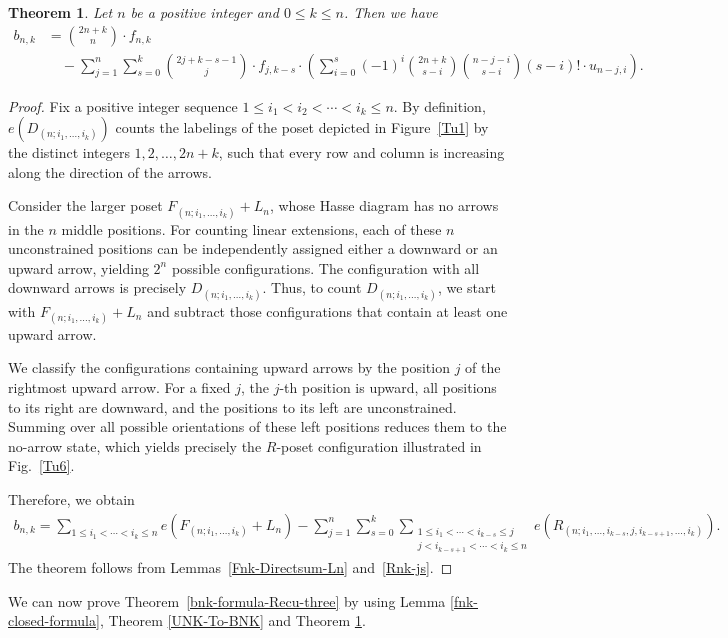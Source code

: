 \documentclass[reqno, 12pt]{article}
\newtheorem{thm}{Theorem}[section]
\theoremstyle{mydefinition}
\theoremstyle{myremark}
\numberwithin{algorithm}{section}
\begin{document}
\begin{thm}\label{bnk-formula-two}
Let $n$ be a positive integer and $0\leq k\leq n$. Then we have
\begin{align*}
b_{n,k}&=\binom{2n+k}{n}\cdot f_{n,k}
\\&\quad-\sum_{j=1}^n \sum_{s=0}^k \binom{2j+k-s-1}{j}\cdot f_{j,k-s}\cdot \left(\sum_{i=0}^s(-1)^i\binom{2n+k}{s-i}\binom{n-j-i}{s-i}(s-i)!\cdot u_{n-j,i}\right).
\end{align*}
\end{thm}
\begin{proof}
Fix a positive integer sequence $1\leq i_1<i_2<\cdots <i_k\leq n$.
By definition, $e(D_{(n; i_1,\ldots,i_k)})$ counts the labelings of the poset depicted in Figure~\ref{Tu1} by the distinct integers $1,2,\ldots,2n+k$, such that every row and column is increasing along the direction of the arrows.

Consider the larger poset $F_{(n; i_1,\ldots,i_k)}+L_n$, whose Hasse diagram has no arrows in the $n$ middle positions.
For counting linear extensions, each of these $n$ unconstrained positions can be independently assigned either a downward or an upward arrow, yielding $2^n$ possible configurations.
The configuration with all downward arrows is precisely $D_{(n; i_1,\ldots,i_k)}$.
Thus, to count $D_{(n; i_1,\ldots,i_k)}$, we start with $F_{(n; i_1,\ldots,i_k)}+L_n$ and subtract those configurations that contain at least one upward arrow.

We classify the configurations containing upward arrows by the position $j$ of the rightmost upward arrow.
For a fixed $j$, the $j$-th position is upward, all positions to its right are downward, and the positions to its left are unconstrained.
Summing over all possible orientations of these left positions reduces them to the no-arrow state, which yields precisely the $R$-poset configuration illustrated in Fig.~\ref{Tu6}.

Therefore, we obtain
\begin{align*}
b_{n,k}=\sum_{1\leq i_1<\cdots <i_k\leq n} e(F_{(n; i_1,\ldots,i_k)}+L_n)-\sum_{j=1}^n \sum_{s=0}^k \sum_{\substack{1\leq i_1<\cdots <i_{k-s}\leq j \\ j< i_{k-s+1}<\cdots <i_k\leq n}} e(R_{(n; i_1,\ldots,i_{k-s},j,i_{k-s+1},\ldots,i_k)}).
\end{align*}
The theorem follows from Lemmas~\ref{Fnk-Directsum-Ln} and~\ref{Rnk-js}.
\end{proof}

We can now prove Theorem~\ref{bnk-formula-Recu-three} by using Lemma \ref{fnk-closed-formula}, Theorem \ref{UNK-To-BNK} and Theorem \ref{bnk-formula-two}.
\end{document}
